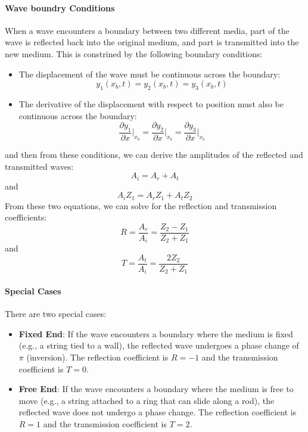 \documentclass[11pt]{report}
\begin{document}
\paragraph{Wave boundry Conditions} When a wave encounters a boundary between two different media, part of the wave is reflected back into the original medium, and part is transmitted into the new medium. This is constrined by the following boundary conditions:
\begin{itemize}
    \item The displacement of the wave must be continuous across the boundary:
    $$
        y_1(x_b, t) = y_2(x_b, t) = y_3(x_b, t)
    $$
    \item The derivative of the displacement with respect to position must also be continuous across the boundary:
    $$
        \frac{\partial y_1}{\partial x}\bigg|_{x_b} = \frac{\partial y_2}{\partial x}\bigg|_{x_b} = \frac{\partial y_3}{\partial x}\bigg|_{x_b}
    $$
\end{itemize}
and then from these conditions, we can derive the amplitudes of the reflected and transmitted waves:
\begin{equation}\label{eq:amp-continuity}
    A_i = A_r + A_t
\end{equation}
and 
$$
    A_i Z_1 = A_r Z_1 + A_t Z_2
$$
From these two equations, we can solve for the reflection and transmission coefficients:
\begin{equation}\label{eq:reflection_coeff}
    R = \frac{A_r}{A_i} = \frac{Z_2 - Z_1}{Z_2 + Z_1}
\end{equation}
and
\begin{equation}\label{eq:transmission_coeff}
    T = \frac{A_t}{A_i} = \frac{2Z_2}{Z_2 + Z_1}
\end{equation}

\paragraph{Special Cases} There are two special cases:
\begin{itemize}
    \item \textbf{Fixed End}: If the wave encounters a boundary where the medium is fixed (e.g., a string tied to a wall), the reflected wave undergoes a phase change of \( \pi \) (inversion). The reflection coefficient is \( R = -1 \) and the transmission coefficient is \( T = 0 \).
    \item \textbf{Free End}: If the wave encounters a boundary where the medium is free to move (e.g., a string attached to a ring that can slide along a rod), the reflected wave does not undergo a phase change. The reflection coefficient is \( R = 1 \) and the transmission coefficient is \( T = 2 \).
\end{itemize}
\end{document}
